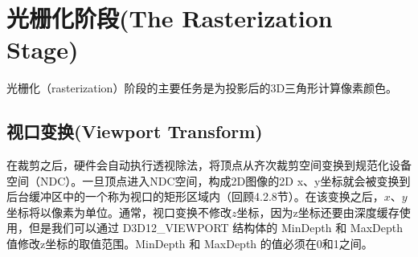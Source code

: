 \documentclass[11pt,a4paper,oldfontcommands]{memoir}
\begin{document}
{\section{光栅化阶段(The Rasterization Stage)}
\begin{flushleft}
光栅化（rasterization）阶段的主要任务是为投影后的3D三角形计算像素颜色。
\end{flushleft}
\subsection{视口变换(Viewport Transform)}
\begin{flushleft}
在裁剪之后，硬件会自动执行透视除法，将顶点从齐次裁剪空间变换到规范化设备空间（NDC）。一旦顶点进入NDC空间，构成2D图像的2D x、y坐标就会被变换到后台缓冲区中的一个称为视口的矩形区域内（回顾4.2.8节）。在该变换之后，$x$、$y$坐标将以像素为单位。通常，视口变换不修改$z$坐标，因为z坐标还要由深度缓存使用，但是我们可以通过 D3D12\_VIEWPORT 结构体的 MinDepth 和 MaxDepth 值修改z坐标的取值范围。MinDepth 和 MaxDepth 的值必须在0和1之间。
\end{flushleft}
}
\end{document}
